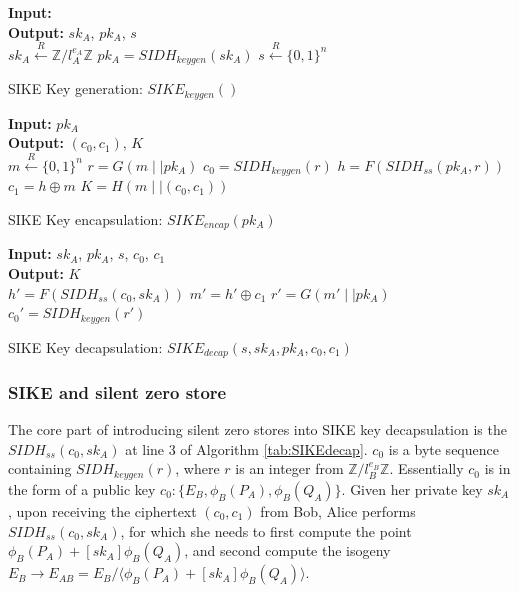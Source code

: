 \documentclass{iacrtrans}
\begin{document}
\begin{multicols}{3}
\begin{algorithm}[H]
\SetAlgoLined
\textbf{Input: }  \\
\textbf{Output: } $sk_A$, $pk_A$, $s$ \\
$sk_A \xleftarrow{R} \mathbb{Z}/l_A^{e_A}\mathbb{Z}$\;
$pk_A = SIDH_{keygen}(sk_A)$\;
$s \xleftarrow{R} \{0,1\}^n$\;
\caption{SIKE Key generation: $SIKE_{keygen}()$}
\label{tab:SIKEencryption}
\end{algorithm}

\columnbreak

\begin{algorithm}[H]
\SetAlgoLined
\textbf{Input: } $pk_A$ \\
\textbf{Output: } $(c_0, c_1)$, $K$ \\
$m \xleftarrow{R} \{0,1\}^n$\;
$r = G(m \mid\mid pk_A)$\;
$c_0 = SIDH_{keygen}(r)$\;
$h = F(SIDH_{ss}(pk_A, r))$\;
$c_1 = h \oplus m$\;
$K = H(m \mid\mid (c_0, c_1))$\;
\caption{SIKE Key encapsulation: $SIKE_{encap}(pk_A)$}
\label{tab:SIKEencap}
\end{algorithm}

\columnbreak

\begin{algorithm}[H]
\SetAlgoLined
\textbf{Input: } $sk_A$, $pk_A$, $s$, $c_0$, $c_1$ \\
\textbf{Output: } $K$ \\
$h' = F(SIDH_{ss}(c_0, sk_A))$\;
$m' = h' \oplus c_1$\;
$r' = G(m' \mid\mid pk_A)$\;
$c_0' = SIDH_{keygen}(r')$\;
\caption{SIKE Key decapsulation: $SIKE_{decap}(s, sk_A, pk_A, c_0, c_1)$}
\label{tab:SIKEdecap}
\end{algorithm}

\end{multicols}

\subsubsection{SIKE and silent zero store}
The core part of introducing silent zero stores into SIKE key decapsulation is the $SIDH_{ss}(c_0, sk_A)$ at line 3 of Algorithm \ref{tab:SIKEdecap}. $c_0$ is a byte sequence containing $SIDH_{keygen}(r)$, where $r$ is an integer from $\mathbb{Z}/l_B^{e_B}\mathbb{Z}$. Essentially $c_0$ is in the form of a public key $c_0: \{E_B, \phi_B(P_A), \phi_B(Q_A)\}$. Given her private key $sk_A$, upon receiving the ciphertext $(c_0, c_1)$ from Bob, Alice performs $SIDH_{ss}(c_0, sk_A)$, for which she needs to first compute the point $\phi_B(P_A) + [sk_A]\phi_B(Q_A)$, and second compute the isogeny $E_B \rightarrow E_{AB}=E_B/\langle \phi_B(P_A) + [sk_A]\phi_B(Q_A)\rangle$.
\end{document}
